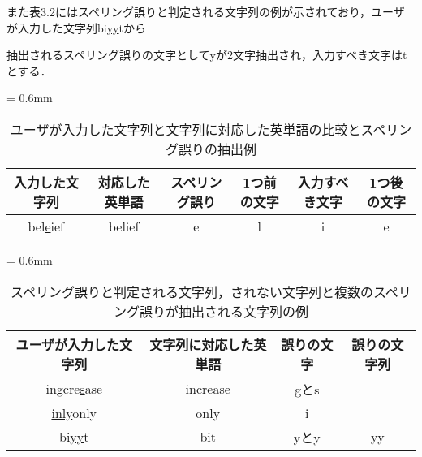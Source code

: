 \begin{comment}
タイピングゲームにおいてスペリング誤りだと判定される文字が連続で入力され，それらの文字の連続が全てスペリング誤りだと判定された場合，それらの文字の連続は文字列として分析を行う．
\end{comment}
また表3.2にはスペリング誤りと判定される文字列の例が示されており，ユーザが入力した文字列bi\underline{yy}tから
\begin{comment}
抽出されるスペリング誤りの文字列としてyyを分析する．
このような編集距離が2以上の文字列に関してのスペリング誤りの確認は目視で行った．
抽出した文字列に含まれる文字は文字単位のスペリング誤りとして扱うことができるので，1文字ずつに分けて文字としても分析を行うものとし，表3.2のユーザが入力した文字列がbi\underline{yy}tの場合では，
\end{comment}
抽出されるスペリング誤りの文字としてyが2文字抽出され，入力すべき文字はtとする．

{\tabcolsep = 0.6mm
  \begin{table*}[!t]
  \footnotesize
  \begin{center}
   \caption{ユーザが入力した文字列と文字列に対応した英単語の比較とスペリング誤りの抽出例}
   \begin{tabular}{|c|c|c|c|c|c|} \hline
       	入力した文字列 & 対応した英単語 & スペリング誤り & 1つ前の文字 & 入力すべき文字 & 1つ後の文字\\ \hline
	    bel\underline{e}ief & belief & e & l & i & e\\ \hline
   \end{tabular}
  \end{center}
 \end{table*}
}

{\tabcolsep = 0.6mm
 \begin{table*}[!t]
  \small
  \begin{center}
   \caption{スペリング誤りと判定される文字列，されない文字列と複数のスペリング誤りが抽出される文字列の例}
   \begin{tabular}{|c|c|c|c|} \hline
       	ユーザが入力した文字列 & 文字列に対応した英単語 & 誤りの文字 & 誤りの文字列\\ \hline
		in\underline{g}cre\underline{s}ase & increase & gとs & \\ \hline
		\underline{inly}only & only & i & \\ \hline
	    bi\underline{yy}t & bit & yとy & yy\\ \hline
   \end{tabular}
  \end{center}
 \end{table*}
}